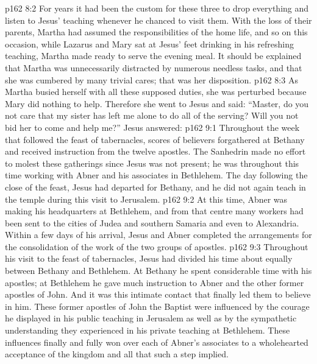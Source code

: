 \vs p162 8:2 For years it had been the custom for these three to drop everything and listen to Jesus’ teaching whenever he chanced to visit them. With the loss of their parents, Martha had assumed the responsibilities of the home life, and so on this occasion, while Lazarus and Mary sat at Jesus’ feet drinking in his refreshing teaching, Martha made ready to serve the evening meal. It should be explained that Martha was unnecessarily distracted by numerous needless tasks, and that she was cumbered by many trivial cares; that was her disposition.
\vs p162 8:3 As Martha busied herself with all these supposed duties, she was perturbed because Mary did nothing to help. Therefore she went to Jesus and said: “Master, do you not care that my sister has left me alone to do all of the serving? Will you not bid her to come and help me?” Jesus answered: 
\vs p162 9:1 Throughout the week that followed the feast of tabernacles, scores of believers forgathered at Bethany and received instruction from the twelve apostles. The Sanhedrin made no effort to molest these gatherings since Jesus was not present; he was throughout this time working with Abner and his associates in Bethlehem. The day following the close of the feast, Jesus had departed for Bethany, and he did not again teach in the temple during this visit to Jerusalem.
\vs p162 9:2 \pc At this time, Abner was making his headquarters at Bethlehem, and from that centre many workers had been sent to the cities of Judea and southern Samaria and even to Alexandria. Within a few days of his arrival, Jesus and Abner completed the arrangements for the consolidation of the work of the two groups of apostles.
\vs p162 9:3 Throughout his visit to the feast of tabernacles, Jesus had divided his time about equally between Bethany and Bethlehem. At Bethany he spent considerable time with his apostles; at Bethlehem he gave much instruction to Abner and the other former apostles of John. And it was this intimate contact that finally led them to believe in him. These former apostles of John the Baptist were influenced by the courage he displayed in his public teaching in Jerusalem as well as by the sympathetic understanding they experienced in his private teaching at Bethlehem. These influences finally and fully won over each of Abner’s associates to a wholehearted acceptance of the kingdom and all that such a step implied.
